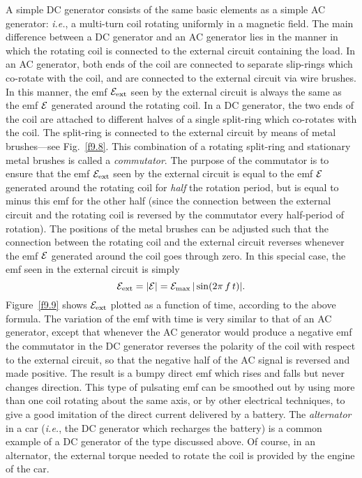 A simple DC generator consists of the same basic elements as a simple
AC generator: {\em i.e.}, a multi-turn coil rotating uniformly in a magnetic
field. The main difference between a DC generator and an AC generator lies
in the manner in which the rotating coil is connected to the external circuit 
containing the load. In an AC generator, both ends of the coil are connected
to separate slip-rings which co-rotate with the coil, and are connected to
the external circuit via wire brushes. In this manner, the emf ${\cal E}_{\rm ext}$
seen by the external circuit is always the same as the emf ${\cal E}$ 
 generated around the rotating
coil. In a DC generator, the two ends of the coil are attached to different halves
of a single split-ring which co-rotates with the coil. The split-ring is connected
 to
the external circuit by means of metal brushes---see Fig.~\ref{f9.8}. 
This combination of a rotating split-ring and stationary metal brushes 
is called a {\em commutator}. The purpose of the commutator is to ensure that
the emf ${\cal E}_{\rm ext}$
seen by the external circuit 
is equal to the emf  ${\cal E}$ 
 generated around the rotating
coil for {\em half}\/ the rotation period, but is equal to minus this emf for the
other half (since the connection between the external circuit and the rotating
coil is reversed by the commutator every half-period of rotation). The
positions of the metal brushes can be adjusted such that the connection between
the rotating coil and the external circuit reverses whenever the emf
${\cal E}$ generated around the coil goes through zero. In this special case,
the emf seen in the external circuit is simply
\begin{equation}
{\cal E}_{\rm ext} = |{\cal E}| = {\cal E}_{\rm max}\,|\sin (2\pi\, f\, t)|.
\end{equation}
Figure~\ref{f9.9} shows ${\cal E}_{\rm ext}$ plotted as a function of
time, according to the above formula.  The variation of the emf with time is
very similar to that of an AC generator, except that whenever the AC generator
would produce a negative emf the commutator in the DC generator reverses
the polarity of the coil with respect to the external circuit, so that the negative
half of the AC signal is reversed and made positive. The result is a bumpy
direct emf which rises and falls but never changes direction. This type of
pulsating emf can be smoothed out by using more than one coil rotating about the
same axis, or by other electrical techniques, to give a good imitation of the
direct current delivered by a battery. The {\em alternator}\/ in a car
({\em i.e.}, the DC generator which recharges the battery) is a common example
of a DC generator
of the type discussed above. Of course, in an alternator, the external torque needed to rotate
the coil is provided by the engine of the car.

